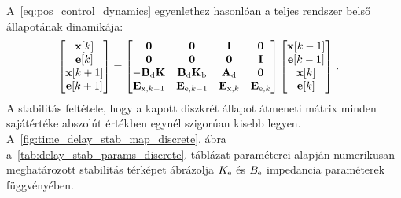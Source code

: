 A~\eqref{eq:pos_control_dynamics} egyenlethez hasonlóan a 
teljes rendszer belső állapotának dinamikája:
\begin{align}
    \begin{split}
        \begin{bmatrix}
        \mathbf{x}[k] \\
        \mathbf{e}[k] \\
        \mathbf{x}[k+1] \\ 
        \mathbf{e}[k+1] \\ 
        \end{bmatrix} &=
        \begin{bmatrix}
            \mathbf{0} & \mathbf{0} & \mathbf{I} & \mathbf{0} \\
            \mathbf{0} & \mathbf{0} & \mathbf{0} & \mathbf{I} \\
            -\mathbf{B}_{\mathrm{d}} \mathbf{K} & \mathbf{B}_{\mathrm{d}} \mathbf{K}_{\mathrm{b}} & \mathbf{A}_{\mathrm{d}} & \mathbf{0} \\
            \mathbf{E}_{\mathrm{x},k-1} & \mathbf{E}_{\mathrm{e},k-1} & \mathbf{E}_{\mathrm{x},k} & \mathbf{E}_{\mathrm{e},k} \\ 
        \end{bmatrix}
        \begin{bmatrix}
            \mathbf{x}[k-1] \\
            \mathbf{e}[k-1] \\
            \mathbf{x}[k] \\ 
            \mathbf{e}[k] \\ 
        \end{bmatrix}\,.
    \end{split}        
\end{align}
A stabilitás feltétele, hogy a kapott diszkrét állapot átmeneti mátrix minden sajátértéke abszolút 
értékben egynél szigorúan kisebb legyen. A~\ref{fig:time_delay_stab_map_discrete}. ábra a~\ref{tab:delay_stab_params_discrete}. táblázat paraméterei alapján numerikusan 
meghatározott stabilitás térképet ábrázolja \(K_{\mathrm{e}}\) és \(B_{\mathrm{e}}\) impedancia paraméterek függvényében. 
